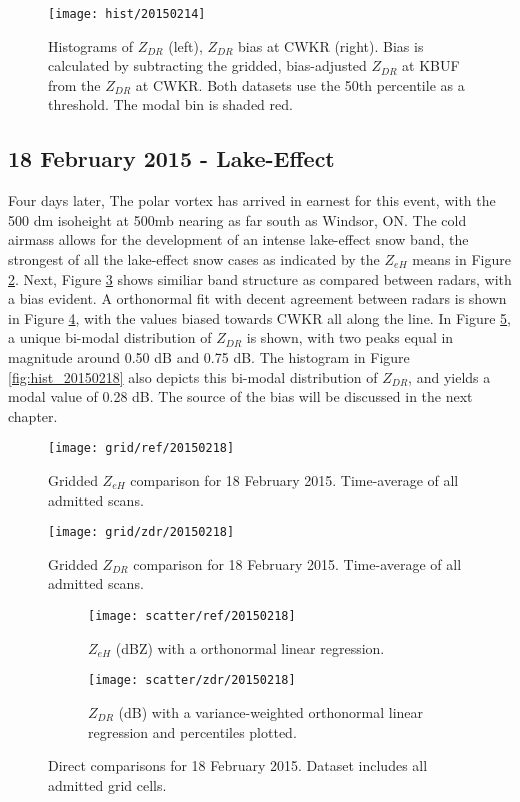 \begin{figure}[p]
\texttt{[image: hist/20150214]}\centering
\caption{Histograms of $Z_{DR}$ (left), $Z_{DR}$ bias at CWKR (right). Bias is calculated by subtracting the gridded, bias-adjusted $Z_{DR}$ at KBUF from the
$Z_{DR}$ at CWKR. Both datasets use the 50th percentile as a threshold. The modal bin is shaded red.} 
\label{fig:hist_20150214}
\end{figure}

\subsection{18 February 2015 - Lake-Effect}
Four days later, The polar vortex has arrived in earnest for this event, with the 500 dm isoheight at 500mb nearing as far south as Windsor, ON. The cold airmass allows for the development of an intense lake-effect snow band, the strongest of all the lake-effect snow cases as indicated by the $Z_{eH}$ means in Figure \ref{fig:grid_ref_20150218}. Next, Figure \ref{fig:grid_zdr_20150218} shows similiar band structure as compared between radars, with a bias evident. A orthonormal fit with decent agreement between radars is shown in Figure \ref{fig:scatter_ref_20150218}, with the values biased towards CWKR all along the line. In Figure \ref{fig:scatter_zdr_20150218}, a unique bi-modal distribution of $Z_{DR}$ is shown, with two peaks equal in magnitude around 0.50 dB and 0.75 dB. The histogram in Figure \ref{fig:hist_20150218} also depicts this bi-modal distribution of $Z_{DR}$, and yields a modal value of 0.28 dB. The source of the bias will be discussed in the next chapter. 
\begin{figure}[H]
\texttt{[image: grid/ref/20150218]}
\caption{Gridded $Z_{eH}$ comparison for 18 February 2015. Time-average of all admitted scans.} 
\label{fig:grid_ref_20150218}
\end{figure}

\begin{figure}[p]
\texttt{[image: grid/zdr/20150218]}
\caption{Gridded $Z_{DR}$ comparison for 18 February 2015. Time-average of all admitted scans.} 
\label{fig:grid_zdr_20150218}
\end{figure}

\begin{figure}[p]
\centering
   \begin{subfigure}[t]{0.48\linewidth} \centering
     \texttt{[image: scatter/ref/20150218]}
     \caption{$Z_{eH}$ (dBZ) with a orthonormal linear regression.}\label{fig:scatter_ref_20150218}
   \end{subfigure}
   \begin{subfigure}[t]{0.48\linewidth} \centering
     \texttt{[image: scatter/zdr/20150218]}
     \caption{$Z_{DR}$ (dB) with a variance-weighted orthonormal linear regression and percentiles plotted.}\label{fig:scatter_zdr_20150218}
   \end{subfigure}
\caption{Direct comparisons for 18 February 2015. Dataset includes all admitted grid cells.} \label{fig:scatter_20150218}
\end{figure}

